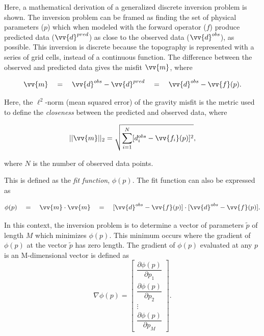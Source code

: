 \documentclass[tc, manuscript]{copernicus}
\begin{document}
Here, a mathematical derivation of a generalized discrete inversion problem is shown. The inversion problem can be framed as finding the set of physical parameters ($p$) which when modeled with the forward operator ($f$) produce predicted data ($\vv{d}^{pred}$) as close to the observed data ($\vv{d}^{obs}$), as possible. This inversion is discrete because the topography is represented with a series of grid cells, instead of a continuous function. The difference between the observed and predicted data gives the misfit $\vv{m}$, where

\begin{equation} \label{eq:misfit2}
    \vv{m} \quad = \quad \vv{d}^{obs} - \vv{d}^{pred} \quad = \quad \vv{d}^{obs} - \vv{f}(p).
\end{equation}

Here, the $\ell^2$-norm (mean squared error) of the gravity misfit is the metric used to define the \textit{closeness} between the predicted and observed data, where

\begin{equation}
    ||\vv{m}||_2 =  \sqrt{\sum_{i=1}^N [d_i^{obs} - \vv{f_i}(p)]^2},
\end{equation}

where $N$ is the number of observed data points.

This is defined as the \textit{fit function}, $\phi(p)$.  The fit function can also be expressed as

\begin{equation}\label{eq:fit_func}
    \phi(p) \quad = \quad \vv{m}\cdot\vv{m} \quad = \quad [\vv{d}^{obs} - \vv{f}(p)]\cdot[\vv{d}^{obs} - \vv{f}(p)].
\end{equation}

In this context, the inversion problem is to determine a vector of parameters $\tilde{p}$ of length $M$ which minimizes $\phi(p)$. This minimum occurs where the gradient of $\phi(p)$ at the vector $\tilde{p}$ has zero length.  The gradient of  $\phi(p)$ evaluated at any $p$ is an M-dimensional vector is defined as
\begin{equation}\label{eq:gradient}
    \nabla\phi(p) = \left[\begin{array}{ccc}
    \dfrac{\partial \phi(p)}{\partial p_{1}}  \\
    \dfrac{\partial \phi(p)}{\partial p_{2}}  \\
    \vdots \\
    \dfrac{\partial \phi(p)}{\partial p_{M}}
\end{array}\right].
\end{equation}
\end{document}
